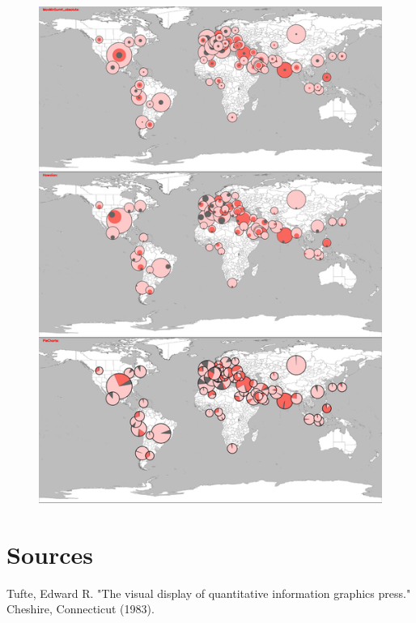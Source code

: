 \documentclass[a4paper,11pt]{article}
\begin{document}
\begin{figure}[htp]
  \includegraphics[width=\textwidth,height=\textheight,keepaspectratio]{assets/covid19_nested_discs.png}
\end{figure}


\newpage


\section{Sources}


Tufte, Edward R. "The visual display of quantitative information graphics press." Cheshire, Connecticut (1983).\\
\end{document}
